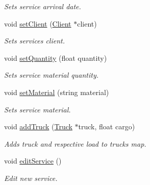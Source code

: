 \begin{DoxyCompactItemize}
\begin{DoxyCompactList}\small\item\em Sets service arrival date. \end{DoxyCompactList}\item 
void \hyperlink{class_service_a1cf3d0b85e44bd7ec58e4a12a7432aef}{set\+Client} (\hyperlink{class_client}{Client} $\ast$client)
\begin{DoxyCompactList}\small\item\em Sets service\textquotesingle{}s client. \end{DoxyCompactList}\item 
void \hyperlink{class_service_a29386f4e82e1de1f654468d4a020c6a4}{set\+Quantity} (float quantity)
\begin{DoxyCompactList}\small\item\em Sets service material quantity. \end{DoxyCompactList}\item 
void \hyperlink{class_service_a9fcafc3bcbdc0b436860ee5626c69ce1}{set\+Material} (string material)
\begin{DoxyCompactList}\small\item\em Sets service material. \end{DoxyCompactList}\item 
void \hyperlink{class_service_a9812c174aa203cb9e7b9f758b1815ac4}{add\+Truck} (\hyperlink{class_truck}{Truck} $\ast$truck, float cargo)
\begin{DoxyCompactList}\small\item\em Adds truck and respective load to trucks map. \end{DoxyCompactList}\item 
void \hyperlink{class_service_a351a27eebc07d1ff3f433d6ad356925a}{edit\+Service} ()
\begin{DoxyCompactList}\small\item\em Edit new service. \end{DoxyCompactList}\end{DoxyCompactItemize}
